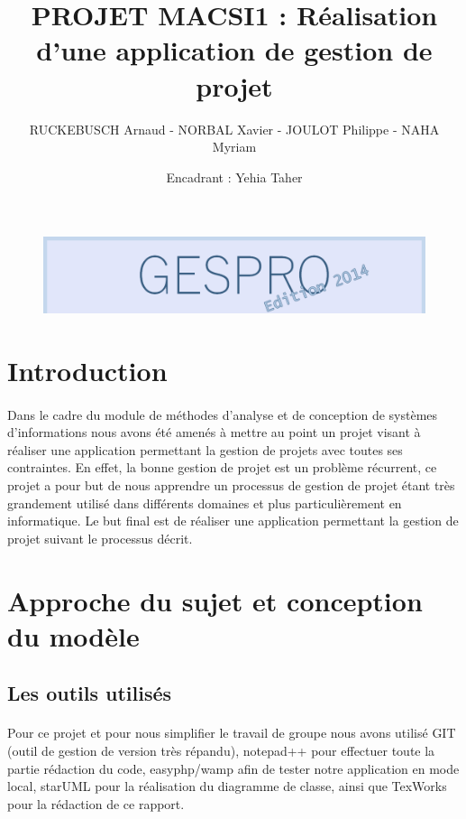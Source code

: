 \documentclass[a4paper, 12pt]{article}
\title{PROJET MACSI1 : Réalisation d'une application de gestion de projet }
\author{RUCKEBUSCH Arnaud - NORBAL Xavier - JOULOT Philippe - NAHA Myriam}
\date{Encadrant : Yehia Taher}
\makeatletter
\def\maketitle{
  \null
  \thispagestyle{empty}
  \vfill
  \begin{center}\leavevmode
    \normalfont
    {\LARGE \@title\par}
    \vskip 1cm
    {\Large \@author\par}
    \vskip 1cm
    {\Large \@date\par}
  \end{center}
  \vfill
  \null
  \cleardoublepage
  }
\makeatother
\begin{document}
\begin{figure}[h!]
	\includegraphics[width=1\textwidth]{GESPRO2014.png}
\end{figure}
\maketitle

\setcounter{page}{1}
\tableofcontents
\newpage

\section{Introduction}
\paragraph{}Dans le cadre du module de méthodes d’analyse et de conception de systèmes d’informations nous avons été amenés à mettre au point  un projet visant à réaliser une application permettant la gestion de projets avec toutes ses contraintes. En effet, la  bonne gestion de projet est un problème récurrent, ce projet a pour but de nous apprendre un processus de gestion de projet étant très grandement utilisé dans différents domaines et plus particulièrement en informatique. Le but final est de réaliser une application permettant la gestion de projet suivant le processus décrit.

\newpage

\section{Approche du sujet et conception du modèle}

\subsection{Les outils utilisés}
\paragraph{}Pour ce projet et pour nous simplifier le travail de groupe nous avons utilisé GIT (outil de gestion de version très répandu), notepad++ pour effectuer toute la partie rédaction du code, easyphp/wamp afin de tester notre application en mode local, starUML pour la réalisation du diagramme de classe, ainsi que TexWorks pour la rédaction de ce rapport.
\end{document}
